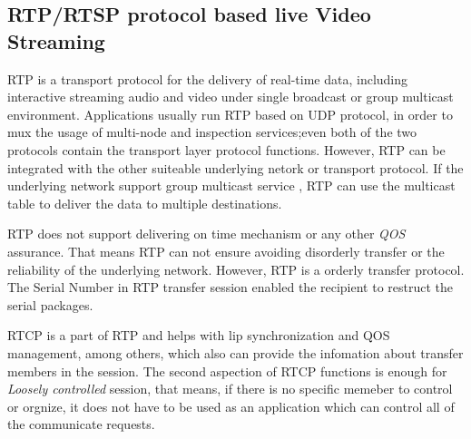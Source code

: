 \subsection{RTP/RTSP protocol based live Video Streaming}
{
RTP is a transport protocol for the delivery of real-time data, including interactive streaming audio and video under single broadcast or group multicast environment. 
Applications usually run RTP based on UDP protocol, in order to mux the usage of multi-node and inspection services;even both of the two protocols contain the transport layer protocol functions.
However, RTP can be integrated with the other suiteable underlying netork or transport protocol. 
If the underlying network support group multicast service , RTP can use the multicast table to deliver the data to multiple destinations.

RTP does not support delivering on time mechanism or any other \emph{QOS} assurance. That means RTP can not ensure avoiding disorderly transfer or the reliability of the underlying network. However, RTP is a orderly transfer protocol. The Serial Number in RTP transfer session enabled the recipient to restruct the serial packages.

RTCP is a part of RTP and helps with lip synchronization and QOS management, among others, which also can provide the infomation about transfer members in the session. The second aspection of RTCP functions is enough for \emph{Loosely controlled} session, that means, if there is no specific memeber to control or orgnize, it does not have to be used as an application which can control all of the communicate requests.

}
